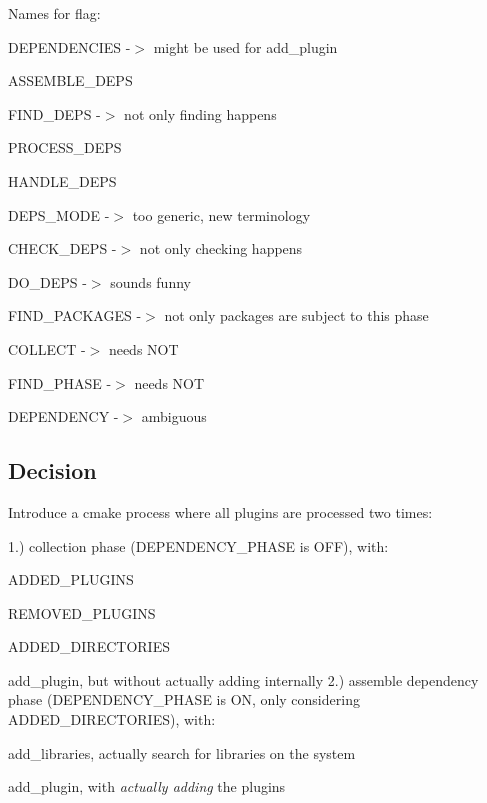 Names for flag\+:


\begin{DoxyItemize}
\item {\ttfamily D\+E\+P\+E\+N\+D\+E\+N\+C\+I\+E\+S} -\/$>$ might be used for {\ttfamily add\+\_\+plugin}
\item {\ttfamily A\+S\+S\+E\+M\+B\+L\+E\+\_\+\+D\+E\+P\+S}
\item {\ttfamily F\+I\+N\+D\+\_\+\+D\+E\+P\+S} -\/$>$ not only finding happens
\item {\ttfamily P\+R\+O\+C\+E\+S\+S\+\_\+\+D\+E\+P\+S}
\item {\ttfamily H\+A\+N\+D\+L\+E\+\_\+\+D\+E\+P\+S}
\item {\ttfamily D\+E\+P\+S\+\_\+\+M\+O\+D\+E} -\/$>$ too generic, new terminology
\item {\ttfamily C\+H\+E\+C\+K\+\_\+\+D\+E\+P\+S} -\/$>$ not only checking happens
\item {\ttfamily D\+O\+\_\+\+D\+E\+P\+S} -\/$>$ sounds funny
\item {\ttfamily F\+I\+N\+D\+\_\+\+P\+A\+C\+K\+A\+G\+E\+S} -\/$>$ not only packages are subject to this phase
\item {\ttfamily C\+O\+L\+L\+E\+C\+T} -\/$>$ needs N\+O\+T
\item {\ttfamily F\+I\+N\+D\+\_\+\+P\+H\+A\+S\+E} -\/$>$ needs N\+O\+T
\item {\ttfamily D\+E\+P\+E\+N\+D\+E\+N\+C\+Y} -\/$>$ ambiguous
\end{DoxyItemize}

\subsection*{Decision}

Introduce a cmake process where all plugins are processed two times\+:

1.) collection phase ({\ttfamily D\+E\+P\+E\+N\+D\+E\+N\+C\+Y\+\_\+\+P\+H\+A\+S\+E} is {\ttfamily O\+F\+F}), with\+:
\begin{DoxyItemize}
\item {\ttfamily A\+D\+D\+E\+D\+\_\+\+P\+L\+U\+G\+I\+N\+S}
\item {\ttfamily R\+E\+M\+O\+V\+E\+D\+\_\+\+P\+L\+U\+G\+I\+N\+S}
\item {\ttfamily A\+D\+D\+E\+D\+\_\+\+D\+I\+R\+E\+C\+T\+O\+R\+I\+E\+S}
\item add\+\_\+plugin, but without actually adding internally 2.) assemble dependency phase ({\ttfamily D\+E\+P\+E\+N\+D\+E\+N\+C\+Y\+\_\+\+P\+H\+A\+S\+E} is {\ttfamily O\+N}, only considering {\ttfamily A\+D\+D\+E\+D\+\_\+\+D\+I\+R\+E\+C\+T\+O\+R\+I\+E\+S}), with\+:
\item add\+\_\+libraries, actually search for libraries on the system
\item add\+\_\+plugin, with {\itshape actually adding} the plugins
\end{DoxyItemize}

